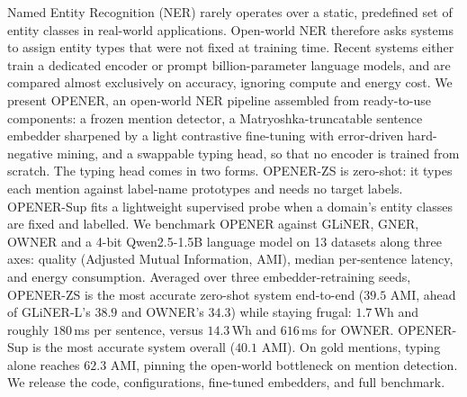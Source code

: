 Named Entity Recognition (NER) rarely operates over a static, predefined set of entity classes in real-world applications.
Open-world NER therefore asks systems to assign entity types that were not fixed at training time.
Recent systems either train a dedicated encoder or prompt billion-parameter language models, and are compared almost exclusively on accuracy, ignoring compute and energy cost.
We present OPENER, an open-world NER pipeline assembled from ready-to-use components: a frozen mention detector, a Matryoshka-truncatable sentence embedder sharpened by a light contrastive fine-tuning with error-driven hard-negative mining, and a swappable typing head, so that no encoder is trained from scratch.
The typing head comes in two forms.
OPENER-ZS is zero-shot: it types each mention against label-name prototypes and needs no target labels.
OPENER-Sup fits a lightweight supervised probe when a domain's entity classes are fixed and labelled.
We benchmark OPENER against GLiNER, GNER, OWNER and a 4-bit Qwen2.5-1.5B language model on 13 datasets along three axes: quality (Adjusted Mutual Information, AMI), median per-sentence latency, and energy consumption.
Averaged over three embedder-retraining seeds, OPENER-ZS is the most accurate zero-shot system end-to-end ($39.5$ AMI, ahead of GLiNER-L's $38.9$ and OWNER's $34.3$) while staying frugal: $1.7$\,Wh and roughly $180$\,ms per sentence, versus $14.3$\,Wh and $616$\,ms for OWNER.
OPENER-Sup is the most accurate system overall ($40.1$ AMI).
On gold mentions, typing alone reaches $62.3$ AMI, pinning the open-world bottleneck on mention detection.
We release the code, configurations, fine-tuned embedders, and full benchmark.
